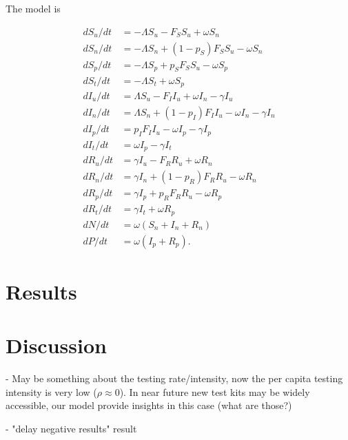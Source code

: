 \documentclass{article}
\begin{document}
The model is

\begin{align}
\label{model}
 d S_u/dt &= -\Lambda S_u - F_S S_u + \omega S_n \\
 d S_n/dt &= -\Lambda S_n + (1-p_S) F_S S_u - \omega S_n \\
 d S_p/dt &= -\Lambda S_p + p_S F_S S_u - \omega S_p \\
 d S_t/dt &= -\Lambda S_t + \omega S_p \\
 d I_u/dt &= \Lambda S_u - F_I I_u + \omega I_n  - \gamma I_u  \\
 d I_n/dt &= \Lambda S_n + (1-p_I) F_I I_u - \omega I_n -\gamma I_n \\
 d I_p/dt &= p_I F_I I_u - \omega I_p -\gamma I_p \\
 d I_t/dt &= \omega I_p - \gamma I_t  \\
 d R_u/dt &= \gamma I_u - F_R R_u + \omega R_n \\
 d R_n/dt &= \gamma I_n + (1-p_R) F_R R_u - \omega R_n  \\
 d R_p/dt &= \gamma I_p + p_R F_R R_u  - \omega R_p  \\
 d R_t/dt&= \gamma I_t + \omega R_p  \\
 dN/dt &= \omega (S_n + I_n + R_n)   \\
 dP/dt &= \omega(I_p + R_p).
\end{align}

\section{Results}


\section{Discussion}

- May be something about the testing rate/intensity, now the per capita testing intensity is very low ($\rho \approx 0$). In near future new test kits may be widely accessible, our model provide insights in this case (what are those?)

- "delay negative results" result



\end{document}

